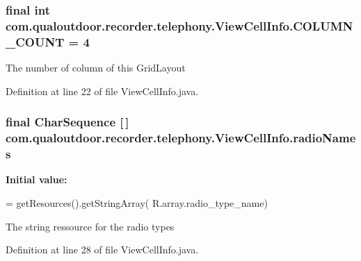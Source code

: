 \hypertarget{classcom_1_1qualoutdoor_1_1recorder_1_1telephony_1_1ViewCellInfo_af6b0947b2c8f01e27c6b16c5f11063dc}{
\subsubsection[{C\-O\-L\-U\-M\-N\-\_\-\-C\-O\-U\-N\-T}]{\setlength{\rightskip}{0pt plus 5cm}final int com.\-qualoutdoor.\-recorder.\-telephony.\-View\-Cell\-Info.\-C\-O\-L\-U\-M\-N\-\_\-\-C\-O\-U\-N\-T = 4\hspace{0.3cm}{\ttfamily [static]}}}\label{classcom_1_1qualoutdoor_1_1recorder_1_1telephony_1_1ViewCellInfo_af6b0947b2c8f01e27c6b16c5f11063dc}
The number of column of this Grid\-Layout 

Definition at line 22 of file View\-Cell\-Info.\-java.

\hypertarget{classcom_1_1qualoutdoor_1_1recorder_1_1telephony_1_1ViewCellInfo_a4f4b692dc57bb398b89dda1b00bc9fa1}{
\subsubsection[{radio\-Names}]{\setlength{\rightskip}{0pt plus 5cm}final Char\-Sequence \mbox{[}$\,$\mbox{]} com.\-qualoutdoor.\-recorder.\-telephony.\-View\-Cell\-Info.\-radio\-Names\hspace{0.3cm}{\ttfamily [private]}}}\label{classcom_1_1qualoutdoor_1_1recorder_1_1telephony_1_1ViewCellInfo_a4f4b692dc57bb398b89dda1b00bc9fa1}
{\bfseries Initial value\-:}
\begin{DoxyCode}
= getResources().getStringArray(
            R.array.radio\_type\_name)
\end{DoxyCode}
The string ressource for the radio types 

Definition at line 28 of file View\-Cell\-Info.\-java.



